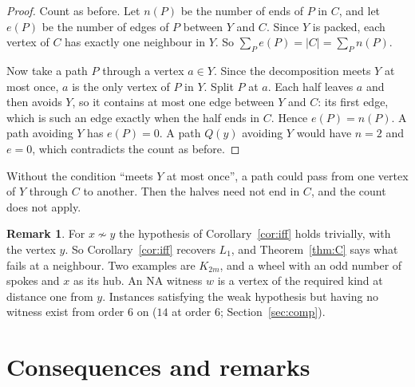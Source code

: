 \documentclass[11pt]{amsart}
\theoremstyle{definition}
\newtheorem{remark}[theorem]{Remark}
\begin{document}
\begin{proof}
Count as before. Let $n(P)$ be the number of ends of $P$ in $C$, and let $e(P)$ be the number of edges of
$P$ between $Y$ and $C$. Since $Y$ is packed, each vertex of $C$ has exactly one neighbour in $Y$. So
$\sum_P e(P)=|C|=\sum_P n(P)$.

Now take a path $P$ through a vertex $a\in Y$. Since the decomposition meets $Y$ at most once, $a$ is
the only vertex of $P$ in $Y$. Split $P$
at $a$. Each half leaves $a$ and then avoids $Y$, so it contains at most one edge between $Y$ and $C$:
its first edge, which is such an edge exactly when the half ends in $C$. Hence $e(P)=n(P)$. A path
avoiding $Y$ has $e(P)=0$. A path $Q(y)$ avoiding $Y$ would have $n=2$ and $e=0$, which contradicts the
count as before.
\end{proof}

Without the condition ``meets $Y$ at most once'', a path could pass from one vertex of $Y$ through $C$
to another. Then the halves need not end in $C$, and the count does not apply.

\begin{remark}\label{rem:L1}
For $x\not\sim y$ the hypothesis of Corollary~\ref{cor:iff} holds trivially, with the vertex $y$. So
Corollary~\ref{cor:iff} recovers $L_1$, and Theorem~\ref{thm:C} says what fails at a neighbour. Two
examples are $K_{2m}$, and a wheel with an odd number of spokes and $x$ as its hub. An NA witness $w$ is a vertex of the required kind at
distance one from $y$. Instances satisfying the weak hypothesis but having no witness exist from order
$6$ on ($14$ at order $6$; Section~\ref{sec:comp}).
\end{remark}

\section{Consequences and remarks}\label{sec:cons}
\end{document}
